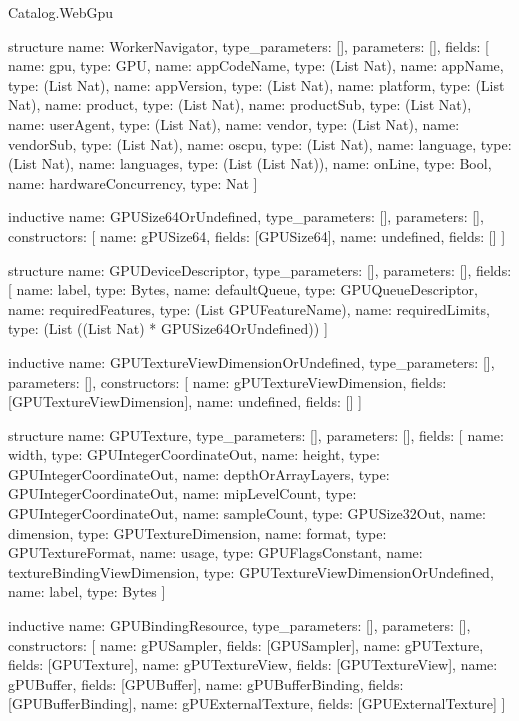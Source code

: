 \begin{lexlean}{Catalog.WebGpu}
\begin{semanticmodule}
structure{
  name: WorkerNavigator,
  type_parameters: [],
  parameters: [],
  fields: [
    {name: gpu, type: GPU},
    {name: appCodeName, type: (List Nat)},
    {name: appName, type: (List Nat)},
    {name: appVersion, type: (List Nat)},
    {name: platform, type: (List Nat)},
    {name: product, type: (List Nat)},
    {name: productSub, type: (List Nat)},
    {name: userAgent, type: (List Nat)},
    {name: vendor, type: (List Nat)},
    {name: vendorSub, type: (List Nat)},
    {name: oscpu, type: (List Nat)},
    {name: language, type: (List Nat)},
    {name: languages, type: (List (List Nat))},
    {name: onLine, type: Bool},
    {name: hardwareConcurrency, type: Nat}
  ]
}

inductive{
  name: GPUSize64OrUndefined,
  type_parameters: [],
  parameters: [],
  constructors: [
    {name: gPUSize64, fields: [GPUSize64]},
    {name: undefined, fields: []}
  ]
}

structure{
  name: GPUDeviceDescriptor,
  type_parameters: [],
  parameters: [],
  fields: [
    {name: label, type: Bytes},
    {name: defaultQueue, type: GPUQueueDescriptor},
    {name: requiredFeatures, type: (List GPUFeatureName)},
    {name: requiredLimits, type: (List ((List Nat) * GPUSize64OrUndefined))}
  ]
}

inductive{
  name: GPUTextureViewDimensionOrUndefined,
  type_parameters: [],
  parameters: [],
  constructors: [
    {name: gPUTextureViewDimension, fields: [GPUTextureViewDimension]},
    {name: undefined, fields: []}
  ]
}

structure{
  name: GPUTexture,
  type_parameters: [],
  parameters: [],
  fields: [
    {name: width, type: GPUIntegerCoordinateOut},
    {name: height, type: GPUIntegerCoordinateOut},
    {name: depthOrArrayLayers, type: GPUIntegerCoordinateOut},
    {name: mipLevelCount, type: GPUIntegerCoordinateOut},
    {name: sampleCount, type: GPUSize32Out},
    {name: dimension, type: GPUTextureDimension},
    {name: format, type: GPUTextureFormat},
    {name: usage, type: GPUFlagsConstant},
    {name: textureBindingViewDimension, type: GPUTextureViewDimensionOrUndefined},
    {name: label, type: Bytes}
  ]
}

inductive{
  name: GPUBindingResource,
  type_parameters: [],
  parameters: [],
  constructors: [
    {name: gPUSampler, fields: [GPUSampler]},
    {name: gPUTexture, fields: [GPUTexture]},
    {name: gPUTextureView, fields: [GPUTextureView]},
    {name: gPUBuffer, fields: [GPUBuffer]},
    {name: gPUBufferBinding, fields: [GPUBufferBinding]},
    {name: gPUExternalTexture, fields: [GPUExternalTexture]}
  ]
}


\end{semanticmodule}
\end{lexlean}
